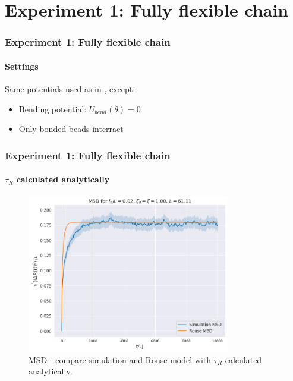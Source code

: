 \documentclass[handout]{beamer}
\begin{document}
\section{Experiment 1: Fully flexible chain}


\begin{frame}
    \frametitle{Experiment 1: Fully flexible chain}
    \framesubtitle{Settings}
    Same potentials used as in \cite[Section 2.1]{svaneborg_2020}, except:
    \begin{itemize}
        \item Bending potential: $U_{bend}(\theta)=0$
        \item Only bonded beads interract
    \end{itemize}
\end{frame}


\begin{frame}
    \frametitle{Experiment 1: Fully flexible chain}
    \framesubtitle{$\tau_R$ calculated analytically}

    \begin{figure}[h]
        \includegraphics[trim={0.1cm 0.1cm 0.1cm 1cm},clip,height=6.9cm]{./3-exp-fixed-param.png}
        \caption{MSD - compare simulation and Rouse model with $\tau_R$ calculated analytically.}
        \label{fig:full-flex-chain-fixed}
    \end{figure}
\end{frame}
\end{document}
